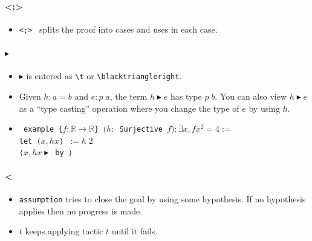 \documentclass[a4paper]{article}
\newcommand{\R}{\mathbb{R}}
\begin{document}
\paragraph{\textless;\textgreater}

\begin{itemize}
    \item \texttt{\ccases <;> \assumption} splits the proof into cases and uses \assumption in each case.
\end{itemize}

\paragraph{$\blacktriangleright$}

\begin{itemize}
    \item $\blacktriangleright$ is entered as \verb|\t| or \verb|\blacktriangleright|.
    \item Given $h : a = b$ and $e : p \; a$, the term $h \blacktriangleright e$ has type $p \; b$. You can also view $h \blacktriangleright e$ as a ``type casting'' operation where you change the type of $e$ by using $h$.
    \item \texttt{%
        example \{$f : \R \to \R$\} $(h :$ Surjective $f) : \exists x, f x ^ 2 = 4 :=$ \\
        let ⟨$x, hx$⟩ $:= h \; 2$ \\
        ⟨$x, hx \blacktriangleright$ by \normnum⟩%
    }
\end{itemize}

\paragraph{\textless\textbar}


\begin{itemize}
    \item \texttt{\ttry assumption} tries to close the goal by using some hypothesis. If no hypothesis applies then no progress is made.
\end{itemize}


\begin{itemize}
    \item \texttt{\rrepeat $t$} keeps applying tactic $t$ until it fails.
\end{itemize}

\end{document}
